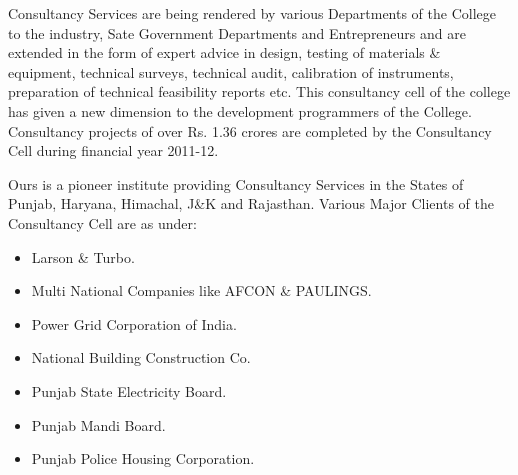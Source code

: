 Consultancy Services are being rendered by various Departments of the 
College to the industry, Sate Government Departments and Entrepreneurs 
and are extended in the form of expert advice in design, testing of 
materials \& equipment, technical surveys, technical audit, calibration 
of instruments, preparation of technical feasibility reports etc. This 
consultancy cell of the college has given a new dimension to the 
development programmers of the College. Consultancy projects of over 
Rs. 1.36 crores are completed by the Consultancy Cell during financial 
year 2011-12.

Ours is a pioneer institute providing Consultancy Services in the 
States of Punjab, Haryana, Himachal, J\&K and Rajasthan. Various Major 
Clients of the Consultancy Cell are as under:
\begin{itemize}
\item Larson \& Turbo.
\item Multi National Companies like AFCON \& PAULINGS.
\item Power Grid Corporation of India.
\item National Building Construction Co.
\item Punjab State Electricity Board.
\item Punjab Mandi Board.
\item Punjab Police Housing Corporation.
\end{itemize}

